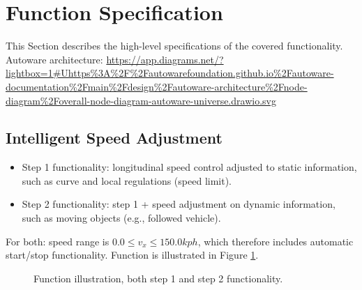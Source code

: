\documentclass[sn-mathphys-num]{sn-jnl}%
\begin{document}
\section{Function Specification} \label{sec:function_specification}
This Section describes the high-level specifications of the covered functionality.
Autoware architecture: \newline
\url{https://app.diagrams.net/?lightbox=1#Uhttps%3A%2F%2Fautowarefoundation.github.io%2Fautoware-documentation%2Fmain%2Fdesign%2Fautoware-architecture%2Fnode-diagram%2Foverall-node-diagram-autoware-universe.drawio.svg}
\subsection{Intelligent Speed Adjustment}
\begin{itemize}
    \item Step 1 functionality: longitudinal speed control adjusted to static information, such as curve and local regulations (speed limit).
    \item Step 2 functionality: step 1 + speed adjustment on dynamic information, such as moving objects (e.g., followed vehicle).
\end{itemize}
For both: speed range is $0.0 \le v_x \le 150.0 kph$, which therefore includes automatic start/stop functionality. Function is illustrated in Figure \ref{fig:lon_sa}.
\begin{figure}[h]
    \caption{Function illustration, both step 1 and step 2 functionality.}
    \label{fig:lon_sa}
\end{figure}
\end{document}
